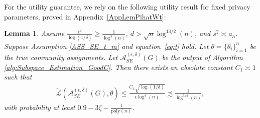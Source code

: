 \documentclass{article}
\newtheorem{lemma}{Lemma}
\begin{document}
For the utility guarantee, we rely on the following utility result for fixed privacy parameters, proved in Appendix~\ref{AppLemPihatWt}:

\begin{lemma}
\label{lemma:Pihat-Pi_weighted}
Assume $\frac{\epsilon^2}{\log(1/\delta)} \geq \frac{1}{\log^3(n)}$, $d > \sqrt{n}\log^{13/2}(n)$, and $s^2 \asymp a_n$. Suppose Assumption \ref{ASS_SE_t_m} and equation~\eqref{eq:t} hold. Let $\theta = \{\theta_i\}_{i = 1}^n$ be the true community assignments. Let $\mathcal{A}_{SE}^{(\epsilon, \delta)}(G)$ be the output of Algorithm \ref{alg:Subspace_Estimation_GoodC}. Then there exists an absolute constant $C_1 \asymp 1$ such that
\begin{align*}
\widetilde{\mathcal{L}}\left(\mathcal{A}_{SE}^{(\epsilon, \delta)}(G), \theta\right) \leq \frac{C_1\sqrt{\log(1/\delta)}}{\epsilon\log^4(n)} \precsim \frac{1}{\log^{5/2}(n)},
\end{align*}
with probability at least $0.9 - 3\zeta - \frac{1}{\mathrm{poly}(n)}$.
\end{lemma}
\end{document}
